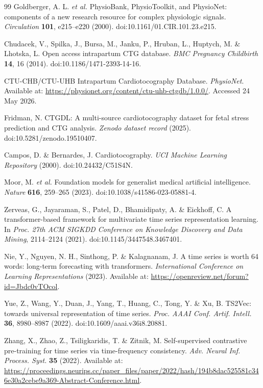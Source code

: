 \documentclass[pdflatex,sn-nature]{sn-jnl}
\begin{document}
\begin{thebibliography}{99}
Goldberger, A. L. \textit{et al.}
PhysioBank, PhysioToolkit, and PhysioNet: components of a new research resource for complex physiologic signals.
\textit{Circulation} \textbf{101}, e215--e220 (2000).
doi:10.1161/01.CIR.101.23.e215.

Chudacek, V., Spilka, J., Bursa, M., Janku, P., Hruban, L., Huptych, M. \& Lhotska, L.
Open access intrapartum CTG database.
\textit{BMC Pregnancy Childbirth} \textbf{14}, 16 (2014).
doi:10.1186/1471-2393-14-16.

CTU-CHB/CTU-UHB Intrapartum Cardiotocography Database.
\textit{PhysioNet}.
Available at: \url{https://physionet.org/content/ctu-uhb-ctgdb/1.0.0/}.
Accessed 24 May 2026.

Fridman, N.
CTGDL: A multi-source cardiotocography dataset for fetal stress prediction and CTG analysis.
\textit{Zenodo dataset record} (2025).
doi:10.5281/zenodo.19510407.

Campos, D. \& Bernardes, J.
Cardiotocography.
\textit{UCI Machine Learning Repository} (2000).
doi:10.24432/C51S4N.

Moor, M. \textit{et al.}
Foundation models for generalist medical artificial intelligence.
\textit{Nature} \textbf{616}, 259--265 (2023).
doi:10.1038/s41586-023-05881-4.

Zerveas, G., Jayaraman, S., Patel, D., Bhamidipaty, A. \& Eickhoff, C.
A transformer-based framework for multivariate time series representation learning.
In \textit{Proc. 27th ACM SIGKDD Conference on Knowledge Discovery and Data Mining}, 2114--2124 (2021).
doi:10.1145/3447548.3467401.

Nie, Y., Nguyen, N. H., Sinthong, P. \& Kalagnanam, J.
A time series is worth 64 words: long-term forecasting with transformers.
\textit{International Conference on Learning Representations} (2023).
Available at: \url{https://openreview.net/forum?id=Jbdc0vTOcol}.

Yue, Z., Wang, Y., Duan, J., Yang, T., Huang, C., Tong, Y. \& Xu, B.
TS2Vec: towards universal representation of time series.
\textit{Proc. AAAI Conf. Artif. Intell.} \textbf{36}, 8980--8987 (2022).
doi:10.1609/aaai.v36i8.20881.

Zhang, X., Zhao, Z., Tsiligkaridis, T. \& Zitnik, M.
Self-supervised contrastive pre-training for time series via time-frequency consistency.
\textit{Adv. Neural Inf. Process. Syst.} \textbf{35} (2022).
Available at: \url{https://proceedings.neurips.cc/paper_files/paper/2022/hash/194b8dac525581c346e30a2cebe9a369-Abstract-Conference.html}.


\end{thebibliography}
\end{document}
